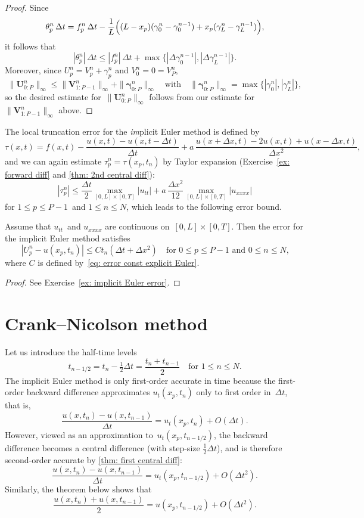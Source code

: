 \begin{proof}
Since
\[
\theta^n_p\,\Delta t=f^n_p\,\Delta t
-\frac{1}{L}\Bigl((L-x_p)(\gamma_0^n-\gamma_0^{n-1})
	+x_p(\gamma_L^n-\gamma_L^{n-1})\Bigr),
\]
it follows that
\[
|\theta^n_p|\,\Delta t\le|f^n_p|\,\Delta t
+\max\bigl\{|\Delta\gamma_0^{n-1}|,|\Delta\gamma_L^{n-1}|\bigr\}.
\]
Moreover, since $U^n_p=V^n_p+\gamma^n_p$ and $V^n_0=0=V^n_P$,
\[
\|\boldsymbol{U}^n_{0:P}\|_\infty\le\|\boldsymbol{V}^n_{1:P-1}\|_\infty
	+\|\boldsymbol{\gamma}^n_{0:P}\|_\infty
\quad\text{with}\quad
\|\boldsymbol{\gamma}^n_{0:P}\|_\infty
	=\max\bigl\{|\gamma^n_0|,|\gamma^n_L|\bigr\},
\]
so the desired estimate for~$\|\boldsymbol{U}^n_{0:P}\|_\infty$ follows from
our estimate for~$\|\boldsymbol{V}^n_{1:P-1}\|_\infty$ above.
\end{proof}

The local truncation error for the \emph{im}plicit Euler method is defined by
\[
\tau(x,t)=f(x,t)-\frac{u(x,t)-u(x,t-\Delta t)}{\Delta t}
	+a\,\frac{u(x+\Delta x,t)-2u(x,t)+u(x-\Delta x,t)}{\Delta x^2},
\]
and we can again estimate $\tau^n_p=\tau(x_p,t_n)$ by Taylor expansion
(Exercise~\ref{ex: forward diff} and \cref{thm: 2nd central diff}):
\[
|\tau^n_p|\le\frac{\Delta t}{2}\max_{[0,L]\times[0,T]}|u_{tt}|
	+a\,\frac{\Delta x^2}{12}\max_{[0,L]\times[0,T]}|u_{xxxx}|
\]
for $1\le p\le P-1$~and $1\le n\le N$, which leads to the following error bound.

\begin{theorem}\label{thm: implicit Euler error}
Assume that $u_{tt}$~and $u_{xxxx}$ are continuous on~$[0,L]\times[0,T]$. Then 
the error for the implicit Euler method satisfies
\[
|U^n_p-u(x_p,t_n)|\le Ct_n(\Delta t+\Delta x^2)
\quad\text{for $0\le p\le P-1$ and $0\le n\le N$,}
\]
where $C$ is defined by~\eqref{eq: error const explicit Euler}.
\end{theorem}
\begin{proof}
See Exercise~\ref{ex: implicit Euler error}.
\end{proof}

\section{Crank--Nicolson method}
Let us introduce the half-time levels
\[
t_{n-1/2}=t_n-\tfrac12\Delta t=\frac{t_n+t_{n-1}}{2}
    \quad\text{for $1\le n\le N$.}
\]
The implicit Euler method is only first-order accurate in time because the 
first-order backward difference approximates $u_t(x_p,t_n)$ only to first order 
in~$\Delta t$, that is,
\[
\frac{u(x,t_n)-u(x,t_{n-1})}{\Delta t}=u_t(x_p,t_n)+O(\Delta t).
\]
However, viewed as an approximation to~$u_t(x_p,t_{n-1/2})$, the backward 
difference becomes a central difference (with step-size $\tfrac12\Delta t$), 
and is therefore second-order accurate by \cref{thm: first central diff}:
\[
\frac{u(x,t_n)-u(x,t_{n-1})}{\Delta t}=u_t(x_p,t_{n-1/2})+O(\Delta t^2).
\]
Similarly, the theorem below shows that
\[
\frac{u(x,t_n)+u(x,t_{n-1})}{2}=u(x_p,t_{n-1/2})+O(\Delta t^2).
\]

